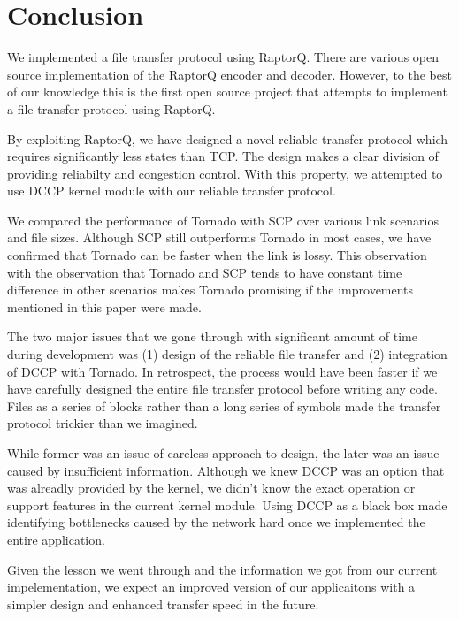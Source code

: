 \documentclass{sig-alternate-10pt}
\begin{document}
\section{Conclusion}
We implemented a file transfer protocol using RaptorQ. There are various open
source implementation of the RaptorQ encoder and decoder. However, to the best
of our knowledge this is the first open source project that attempts to
implement a file transfer protocol using RaptorQ. 

By exploiting RaptorQ, we have designed a novel reliable transfer protocol which
requires significantly less states than TCP. The design makes a clear division
of providing reliabilty and congestion control. With this property, we attempted
to use DCCP kernel module with our reliable transfer protocol.

We compared the performance of Tornado with SCP over various link scenarios and
file sizes. Although SCP still outperforms Tornado in most cases, we have
confirmed that Tornado can be faster when the link is lossy. This observation
with the observation that Tornado and SCP tends to have constant time difference
in other scenarios makes Tornado promising if the improvements mentioned in this
paper were made.

The two major issues that we gone through with significant amount of time during
development was (1) design of the reliable file transfer and (2) integration of
DCCP with Tornado. In retrospect, the process would have been faster if we have
carefully designed the entire file transfer protocol before writing any code.
Files as a series of blocks rather than a long series of symbols made the
transfer protocol trickier than we imagined. 

While former was an issue of careless approach to design, the later was an issue
caused by insufficient information. Although we knew DCCP was an option that was
alreadly provided by the kernel, we didn't know the exact operation or support
features in the current kernel module. Using DCCP as a black box made
identifying bottlenecks caused by the network hard once we implemented the
entire application.

Given the lesson we went through and the information we got from our current
impelementation, we expect an improved version of our applicaitons with a
simpler design and enhanced transfer speed in the future. 



\end{document}
